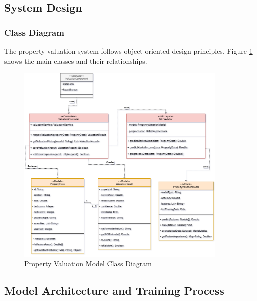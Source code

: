 \subsection{System Design}
\subsubsection{Class Diagram}
The property valuation system follows object-oriented design principles. Figure \ref{fig:valuation-class-diagram} shows the main classes and their relationships.
\newpage

\begin{figure}[htbp]
    \centering
    \includegraphics[width=0.9\textwidth]{images/valuation_class_diagram.png}
    \caption{Property Valuation Model Class Diagram}
    \label{fig:valuation-class-diagram}
\end{figure}
\subsection{Model Architecture and Training Process}
